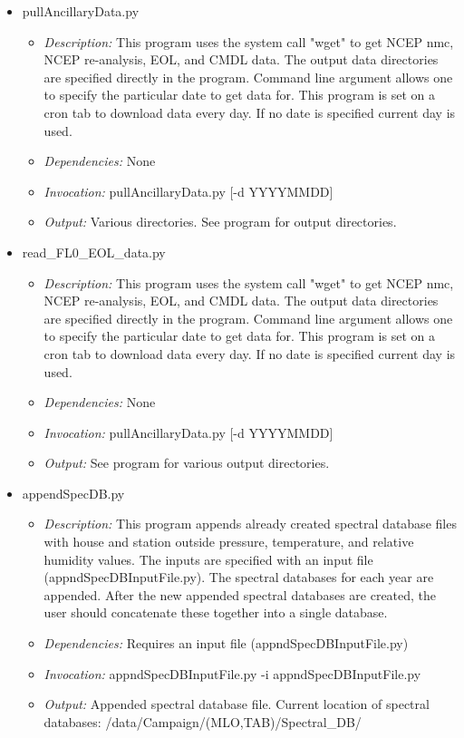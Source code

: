 \documentclass[12pt, letterpaper]{article}
\begin{document}
\begin{itemize}
\item pullAncillaryData.py
\begin{itemize}
\item \textit{Description:} This program uses the system call "wget" to get NCEP nmc, NCEP re-analysis, EOL, and CMDL data. The output data directories are specified directly in the program. Command line argument allows one to specify the particular date to get data for. This program is set on a cron tab to download data every day. If no date is specified current day is used.
\item \textit{Dependencies:} None
\item \textit{Invocation:} pullAncillaryData.py [-d YYYYMMDD]
\item \textit{Output:} Various directories. See program for output directories.
\end{itemize}
\end{itemize}

\begin{itemize}
\item read\_FL0\_EOL\_data.py
\begin{itemize}
\item \textit{Description:} This program uses the system call "wget" to get NCEP nmc, NCEP re-analysis, EOL, and CMDL data. The output data directories are specified directly in the program. Command line argument allows one to specify the particular date to get data for. This program is set on a cron tab to download data every day. If no date is specified current day is used.
\item \textit{Dependencies:} None
\item \textit{Invocation:} pullAncillaryData.py [-d YYYYMMDD]
\item \textit{Output:} See program for various output directories.
\end{itemize}
\end{itemize}

\begin{itemize}
\item appendSpecDB.py
\begin{itemize}
\item \textit{Description:} This program appends already created spectral database files with house and station outside pressure, temperature, and relative humidity values. The inputs are specified with an input file (appndSpecDBInputFile.py). The spectral databases for each year are appended. After the new appended spectral databases are created, the user should concatenate these together into a single database.
\item \textit{Dependencies:} Requires an input file (appndSpecDBInputFile.py)
\item \textit{Invocation:} appndSpecDBInputFile.py -i appndSpecDBInputFile.py
\item \textit{Output:} Appended spectral database file. Current location of spectral databases: /data/Campaign/(MLO,TAB)/Spectral\_DB/
\end{itemize}
\end{itemize}
\end{document}
